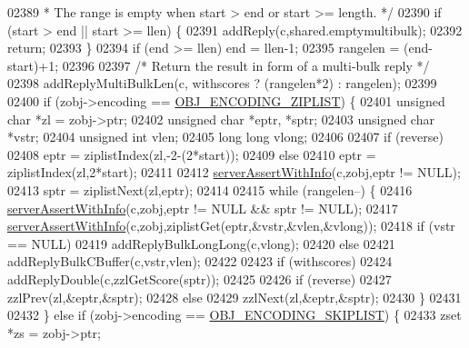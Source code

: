 \begin{DoxyCode}
02389 \textcolor{comment}{     * The range is empty when start > end or start >= length. */}
02390     \textcolor{keywordflow}{if} (start > end || start >= llen) \{
02391         addReply(c,shared.emptymultibulk);
02392         \textcolor{keywordflow}{return};
02393     \}
02394     \textcolor{keywordflow}{if} (end >= llen) end = llen-1;
02395     rangelen = (end-start)+1;
02396 
02397     \textcolor{comment}{/* Return the result in form of a multi-bulk reply */}
02398     addReplyMultiBulkLen(c, withscores ? (rangelen*2) : rangelen);
02399 
02400     \textcolor{keywordflow}{if} (zobj->encoding == \hyperlink{server_8h_aabf064ede983103f1fd0df2086e84eee}{OBJ\_ENCODING\_ZIPLIST}) \{
02401         \textcolor{keywordtype}{unsigned} \textcolor{keywordtype}{char} *zl = zobj->ptr;
02402         \textcolor{keywordtype}{unsigned} \textcolor{keywordtype}{char} *eptr, *sptr;
02403         \textcolor{keywordtype}{unsigned} \textcolor{keywordtype}{char} *vstr;
02404         \textcolor{keywordtype}{unsigned} \textcolor{keywordtype}{int} vlen;
02405         \textcolor{keywordtype}{long} \textcolor{keywordtype}{long} vlong;
02406 
02407         \textcolor{keywordflow}{if} (reverse)
02408             eptr = ziplistIndex(zl,-2-(2*start));
02409         \textcolor{keywordflow}{else}
02410             eptr = ziplistIndex(zl,2*start);
02411 
02412         \hyperlink{server_8h_a7308f76cbff9a8d3797fe78190b91282}{serverAssertWithInfo}(c,zobj,eptr != NULL);
02413         sptr = ziplistNext(zl,eptr);
02414 
02415         \textcolor{keywordflow}{while} (rangelen--) \{
02416             \hyperlink{server_8h_a7308f76cbff9a8d3797fe78190b91282}{serverAssertWithInfo}(c,zobj,eptr != NULL && sptr != NULL);
02417             \hyperlink{server_8h_a7308f76cbff9a8d3797fe78190b91282}{serverAssertWithInfo}(c,zobj,ziplistGet(eptr,&vstr,&vlen,&vlong));
02418             \textcolor{keywordflow}{if} (vstr == NULL)
02419                 addReplyBulkLongLong(c,vlong);
02420             \textcolor{keywordflow}{else}
02421                 addReplyBulkCBuffer(c,vstr,vlen);
02422 
02423             \textcolor{keywordflow}{if} (withscores)
02424                 addReplyDouble(c,zzlGetScore(sptr));
02425 
02426             \textcolor{keywordflow}{if} (reverse)
02427                 zzlPrev(zl,&eptr,&sptr);
02428             \textcolor{keywordflow}{else}
02429                 zzlNext(zl,&eptr,&sptr);
02430         \}
02431 
02432     \} \textcolor{keywordflow}{else} \textcolor{keywordflow}{if} (zobj->encoding == \hyperlink{server_8h_acfb35db5cb30ed113ed23aeb1a224c4c}{OBJ\_ENCODING\_SKIPLIST}) \{
02433         zset *zs = zobj->ptr;

\end{DoxyCode}

